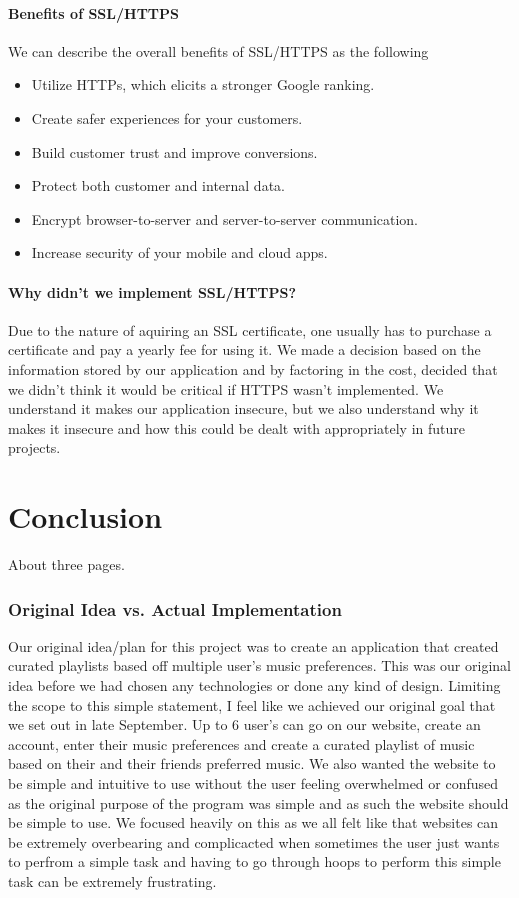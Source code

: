     \subsubsection{Benefits of SSL/HTTPS}
    We can describe the overall benefits of SSL/HTTPS as the following

    \begin{itemize}
      \item Utilize HTTPs, which elicits a stronger Google ranking.
      \item Create safer experiences for your customers.
      \item Build customer trust and improve conversions.
      \item Protect both customer and internal data.
      \item Encrypt browser-to-server and server-to-server communication.
      \item Increase security of your mobile and cloud apps.
    \end{itemize}

    \subsubsection{Why didn't we implement SSL/HTTPS?}
    Due to the nature of aquiring an SSL certificate, one usually has to purchase a certificate and pay a yearly fee for using it. We made a decision based on the information stored by our application and by factoring in the cost, decided that we didn't think it would be critical if HTTPS wasn't implemented.
    We understand it makes our application insecure, but we also understand why it makes it insecure and how this could be dealt with appropriately in future projects.


\chapter{Conclusion}
About three pages.

\subsection{Original Idea vs. Actual Implementation}
Our original idea/plan for this project was to create an application that created curated playlists based off multiple user's music preferences. This was our original idea before we had chosen any technologies or done any kind of design. Limiting the scope to this simple statement, I feel like we achieved our original goal that we set out in late September.
Up to 6 user's can go on our website, create an account, enter their music preferences and create a curated playlist of music based on their and their friends preferred music. We also wanted the website to be simple and intuitive to use without the user feeling overwhelmed or confused as the original purpose of the program was simple and as such the website should be simple to use.
We focused heavily on this as we all felt like that websites can be extremely overbearing and complicacted when sometimes the user just wants to perfrom a simple task and having to go through hoops to perform this simple task can be extremely frustrating.

